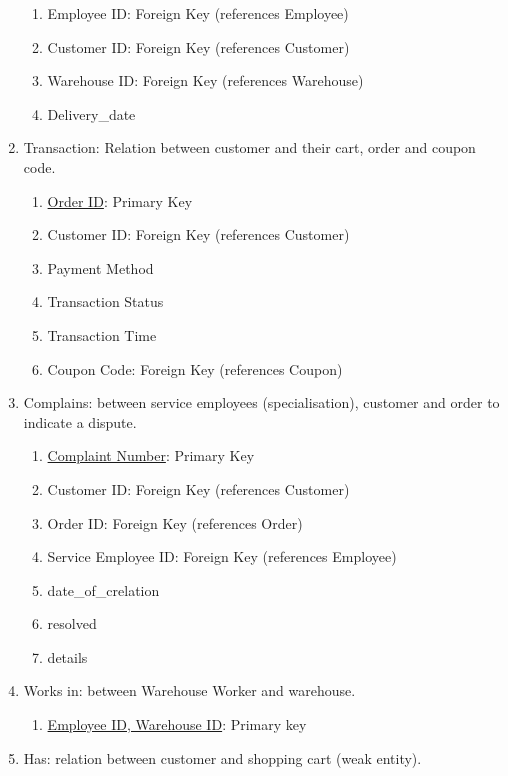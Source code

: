 \documentclass[12pt]{report}
\begin{document}
\begin{enumerate}
\begin{enumerate}
                \item Employee ID: Foreign Key (references Employee)
                \item Customer ID: Foreign Key (references Customer)
                \item Warehouse ID: Foreign Key (references Warehouse)
                \item Delivery\_date
            \end{enumerate}
            \item Transaction: Relation between customer and their cart, order and coupon code.
            \begin{enumerate}
                \item \underline{Order ID}: Primary Key
                \item Customer ID: Foreign Key (references Customer)
                \item Payment Method
                \item Transaction Status
                \item Transaction Time
                \item Coupon Code: Foreign Key (references Coupon)
            \end{enumerate}
            \item Complains: between service employees (specialisation), customer and order to indicate a dispute.
            \begin{enumerate}
                \item \underline {Complaint Number}: Primary Key
                \item Customer ID: Foreign Key (references Customer)
                \item Order ID: Foreign Key (references Order)
                \item Service Employee ID: Foreign Key (references Employee)
                \item date\_of\_crelation
                \item resolved
                \item details
            \end{enumerate}
	\item Works in: between Warehouse Worker and warehouse.
	\begin{enumerate}
				\item \underline{Employee ID, Warehouse ID}: Primary key
			\end{enumerate}
	\item Has: relation between customer and shopping cart (weak entity).

\end{enumerate}
\end{document}
